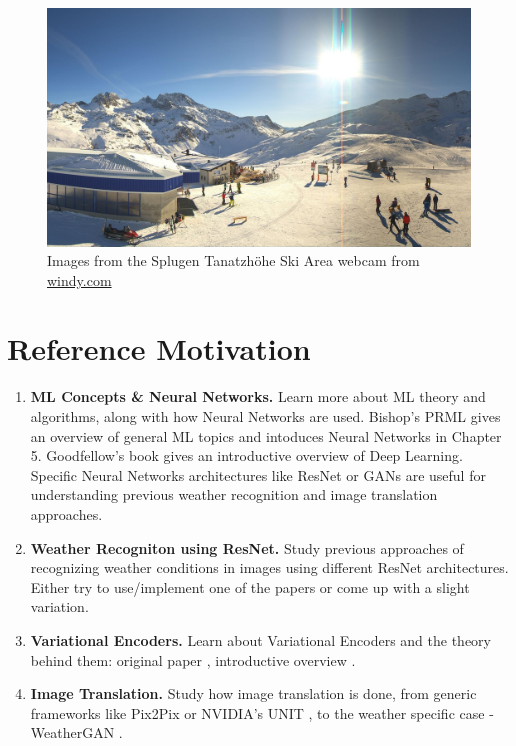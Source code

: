 \documentclass[11pt]{article}
\begin{document}
\begin{figure}[!htb]
            \includegraphics[width=\linewidth]{images/4_snowy_sunny.jpg}
        \endminipage\hfill
        \caption{Images from the Splugen Tanatzhöhe Ski Area webcam from \href{windy.com}{windy.com}}
        \label{fig:windy}
    \end{figure}

    \section{Reference Motivation}
    \begin{enumerate}
        \item \textbf{ML Concepts \& Neural Networks.}
            Learn more about ML theory and algorithms, along with how Neural Networks are used.
            Bishop's PRML \cite{bishop:2006:PRML} gives an overview of general ML topics and intoduces 
            Neural Networks in Chapter 5. Goodfellow's \cite{Goodfellow-et-al-2016} book gives an introductive 
            overview of Deep Learning. Specific Neural Networks architectures like ResNet 
            \cite{DBLP:journals/corr/HeZRS15} or GANs \cite{https://doi.org/10.48550/arxiv.1406.2661}
            are useful for understanding previous weather recognition and image translation approaches.
        \item \textbf{Weather Recogniton using ResNet.}
            Study previous approaches 
            \cite{DBLP:journals/corr/abs-1910-09910, DBLP:journals/corr/abs-1904-10709, 
            DBLP:journals/corr/abs-2103-05422} of recognizing weather conditions in images using different
            ResNet architectures. Either try to use/implement one of the papers or come up with a slight variation.

        \item \textbf{Variational Encoders.}
            Learn about Variational Encoders and the theory behind them: original paper 
            \cite{DBLP:journals/corr/abs-1906-02691}, introductive overview 
            \cite{https://doi.org/10.48550/arxiv.1312.6114}.
        \item \textbf{Image Translation.}
            Study how image translation is done, from generic frameworks like Pix2Pix 
            \cite{DBLP:journals/corr/IsolaZZE16} or NVIDIA's UNIT \cite{DBLP:journals/corr/LiuBK17},
            to the weather specific case - WeatherGAN \cite{DBLP:journals/corr/abs-2103-05422}.
    \end{enumerate}
\end{document}
